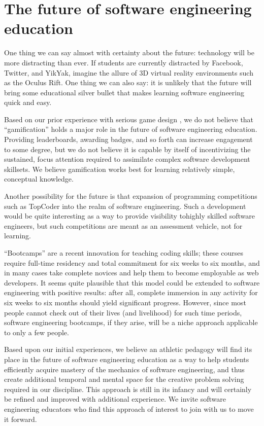 \section{The future of software engineering education}

One thing we can say almost with certainty about the future: technology will be more distracting than ever. If students are currently distracted by Facebook, Twitter, and YikYak, imagine the allure of 3D virtual reality environments such as the Oculus Rift.  One thing we can also say: it is unlikely that the future will bring some educational silver bullet that makes learning software engineering quick and easy. 

Based on our prior experience with serious game design \cite{csdl2-12-06}, we do not believe that ``gamification'' holds a major role in the future of software engineering education. Providing leaderboards, awarding badges, and so forth can increase engagement to some degree, but we do not believe it is capable by itself of incentivizing the sustained, focus attention required to assimilate complex software development skillsets. We believe gamification works best for learning relatively simple, conceptual knowledge.

Another possibility for the future is that expansion of programming competitions such as TopCoder into the realm of software engineering.  Such a development would be quite interesting as a way to provide visibility tohighly skilled software engineers, but such competitions are meant as an assessment vehicle, not for learning. 

``Bootcamps'' are a recent innovation for teaching coding skills; these courses require full-time residency and total commitment for six weeks to six months, and in many cases take complete novices and help them to become employable as web developers.   It seems quite plausible that this model could be extended to software engineering with positive results: after all, complete immersion in any activity for six weeks to six months should yield significant progress.  However, since most people cannot check out of their lives (and livelihood) for such time periods, software engineering bootcamps, if they arise, will be a niche approach applicable to only a few people.

Based upon our initial experiences, we believe an athletic pedagogy will find its place in the future of software engineering education as a way to help students efficiently acquire mastery of the mechanics of software engineering, and thus create additional temporal and mental space for the creative problem solving required in our discipline. This approach is still in its infancy and will certainly be refined and improved with additional experience. We invite software engineering educators who find this approach of interest to join with us to move it forward. 

